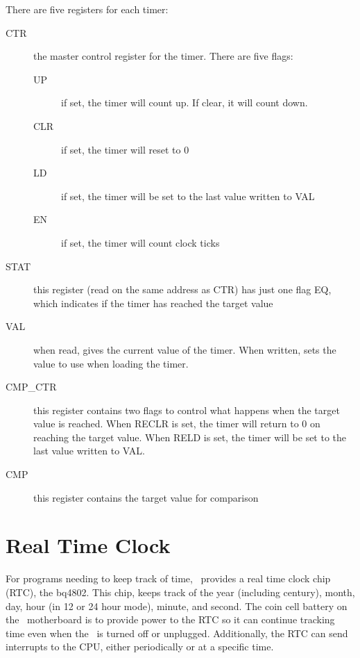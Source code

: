 There are five registers for each timer:
\begin{description}
    \item[CTR] the master control register for the timer. There are five flags:
        \begin{description}
            \item[UP] if set, the timer will count up. If clear, it will count down.

            \item[CLR] if set, the timer will reset to 0

            \item[LD] if set, the timer will be set to the last value written to VAL

            \item[EN] if set, the timer will count clock ticks
        \end{description}

    \item[STAT] this register (read on the same address as CTR) has just one flag EQ, which indicates if the timer has reached the target value

    \item[VAL] when read, gives the current value of the timer. When written, sets the value to use when loading the timer.

    \item[CMP\_CTR] this register contains two flags to control what happens when the target value is reached. When RECLR is set, the timer will return to 0 on reaching the target value. When RELD is set, the timer will be set to the last value written to VAL.

    \item[CMP] this register contains the target value for comparison
\end{description}

\section*{Real Time Clock}

For programs needing to keep track of time, \jr\ provides a real time clock chip (RTC), the bq4802. This chip, keeps track of the year (including century), month, day, hour (in 12 or 24 hour mode), minute, and second. The coin cell battery on the \jr\ motherboard is to provide power to the RTC so it can continue tracking time even when the \jr\ is turned off or unplugged. Additionally, the RTC can send interrupts to the CPU, either periodically or at a specific time.

